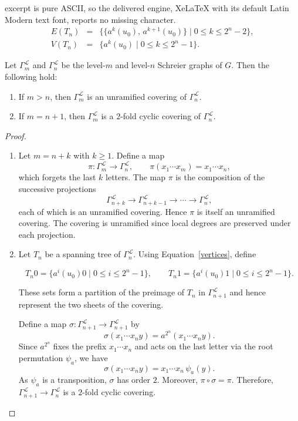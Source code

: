 \documentclass[10pt,a4paper]{amsart}
\newcommand{\G}{\Gamma}
\renewcommand{\L}{\mathcal{L}}
\begin{document}
excerpt is pure ASCII, so the delivered engine, XeLaTeX with its default Latin Modern text font, reports no missing character.
\begin{eqnarray}
\label{edges}
E(T_n) &=& \bigl\{ \{a^k(u_0),\, a^{k+1}(u_0)\} \;\big|\; 0 \le k \le 2^n-2 \bigr\}, \\
\label{vertices}
V(T_n) &=& \bigl\{ a^k(u_0) \;\big|\; 0 \le k \le 2^n-1 \bigr\}.
\end{eqnarray}

\begin{mypro}\label{pro:linear}
Let $\G_m^{\L}$ and $\G_n^{\L}$ be the level-$m$ and level-$n$ Schreier graphs of $G$. Then the following hold:
\begin{enumerate}
  \item \label{item:unrami_L}
  If $m>n$, then $\G_m^{\L}$ is an unramified covering of $\G_n^{\L}$.
  \item \label{item:galois_L}
  If $m=n+1$, then $\G_m^{\L}$ is a $2$-fold cyclic covering of $\G_n^{\L}$.
\end{enumerate}
\end{mypro}

\begin{proof}
\begin{enumerate}
  \item
  Let $m=n+k$ with $k\ge1$. Define a map
  $$\pi:\G_m^{\L}\longrightarrow \G_n^{\L}, \qquad
  \pi(x_1\cdots x_m)=x_1\cdots x_n,$$
  which forgets the last $k$ letters.
  The map $\pi$ is the composition of the successive projections
 $$ \G_{n+k}^{\L}\to \G_{n+k-1}^{\L}\to \cdots \to \G_n^{\L},$$
  each of which is an unramified covering. Hence $\pi$ is itself an unramified covering.
  The covering is unramified since local degrees are preserved under each projection.

  \item
  Let $T_n$ be a spanning tree of $\G_n^{\L}$. Using Equation~\eqref{vertices}, define
  
  $$T_n0=\{a^i(u_0)0 \mid 0\le i\le 2^n-1\}, \qquad
  T_n1=\{a^i(u_0)1 \mid 0\le i\le 2^n-1\}.$$
  
  These sets form a partition of the preimage of $T_n$ in $\G_{n+1}^{\L}$ and hence
  represent the two sheets of the covering.

  Define a map $\sigma:\G_{n+1}^{\L}\to \G_{n+1}^{\L}$ by
  $$ \sigma(x_1\cdots x_n y)=a^{2^n}(x_1\cdots x_n y).$$
  Since $a^{2^n}$ fixes the prefix $x_1\cdots x_n$ and acts on the last letter via the
  root permutation $\psi_a$, we have
 $$ \sigma(x_1\cdots x_n y)=x_1\cdots x_n\,\psi_a(y).$$
  As $\psi_a$ is a transposition, $\sigma$ has order $2$. Moreover,
  $\pi\circ\sigma=\pi$. Therefore, $\G_{n+1}^{\L}\to\G_n^{\L}$ is a $2$-fold cyclic covering.
\end{enumerate}
\end{proof}
\end{document}
